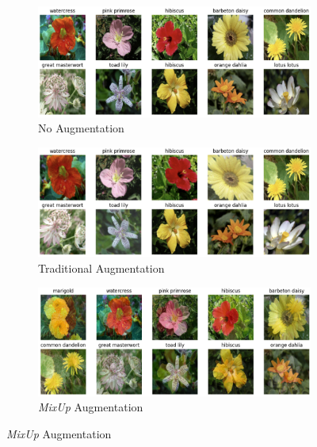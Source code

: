 \begin{figure}[!htb]
    \centering
    \begin{subfigure}{0.7\textwidth}
        \includegraphics[scale=0.50]{Images/no-augmentation.png}
        \caption{No Augmentation}
    \end{subfigure}
    \vspace{0.3cm}

    \begin{subfigure}{0.7\textwidth}
        \includegraphics[scale=0.50]{Images/traditional-augmentation-4.png}
        \caption{Traditional Augmentation}
    \end{subfigure}
    \vspace{0.3cm}

    \begin{subfigure}{0.7\textwidth}
        \includegraphics[scale=0.85]{mixup-augmentation.png}
        \caption{\textit{MixUp} Augmentation}
    \end{subfigure}
    \vspace{0.3cm}


\end{figure}

